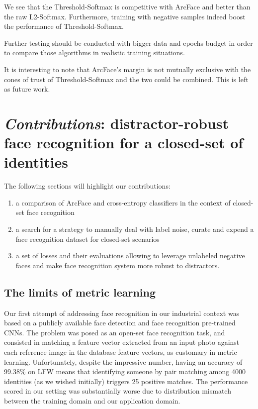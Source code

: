 We see that the Threshold-Softmax is competitive with ArcFace and better than the raw L2-Softmax. Furthermore, training with negative samples indeed boost the performance of Threshold-Softmax.

Further testing should be conducted with bigger data and epochs budget in order to compare those algorithms in realistic training situations.

It is interesting to note that ArcFace's margin is not mutually exclusive with the cones of trust of Threshold-Softmax and the two could be combined. This is left as future work.

\section{\emph{\arr Contributions}: distractor-robust face recognition for a closed-set of identities}

The following sections will highlight our contributions:

\begin{enumerate}
    \item a comparison of ArcFace and cross-entropy classifiers in the context of closed-set face recognition
    \item a search for a strategy to manually deal with label noise, curate and expend a face recognition dataset for closed-set scenarios
    \item a set of losses and their evaluations allowing to leverage unlabeled negative faces and make face recognition system more robust to distractors. 
\end{enumerate}

\subsection{The limits of metric learning}

Our first attempt of addressing face recognition in our industrial context was based on a publicly available face detection and face recognition pre-trained CNNs. The problem was posed as an open-set face recognition task, and consisted in matching a feature vector extracted from an input photo against each reference image in the database feature vectors, as customary in metric learning. Unfortunately, despite the impressive number, having an accuracy of 99.38\% on LFW means that identifying someone by pair matching among 4000 identities (as we wished initially) triggers 25 positive matches. The performance scored in our setting was substantially worse due to distribution mismatch between the training domain and our application domain.

